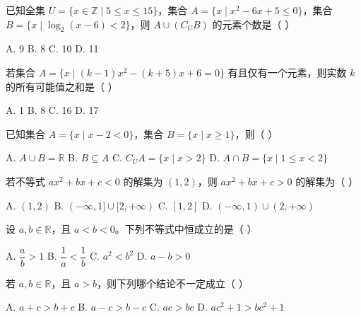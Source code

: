 \documentclass[11pt, a4paper]{article}
\begin{document}

\begin{baitap}[1]
已知全集 $U = \{x \in \mathbb{Z} \mid 5 \le x \le 15\}$，集合 $A = \{x \mid x^2 - 6x + 5 \le 0\}$，集合 $B = \{x \mid \log_2(x - 6) < 2\}$，则 $A \cup (C_U B)$ 的元素个数是（ ）
\par\vspace{3pt}
\noindent A. 9 \quad B. 8 \quad C. 10 \quad D. 11
\end{baitap}

\begin{baitap}[2]
若集合 $A = \{x \mid (k - 1)x^2 - (k + 5)x + 6 = 0\}$ 有且仅有一个元素，则实数 $k$ 的所有可能值之和是（ ）
\par\vspace{3pt}
\noindent A. 1 \quad B. 8 \quad C. 16 \quad D. 17
\end{baitap}

\begin{baitap}[3]
已知集合 $A = \{x \mid x - 2 < 0\}$，集合 $B = \{x \mid x \ge 1\}$，则（ ）
\par\vspace{3pt}
\noindent A. $A \cup B = \mathbb{R}$ \quad B. $B \subseteq A$ \quad C. $C_U A = \{x \mid x > 2\}$ \quad D. $A \cap B = \{x \mid 1 \le x < 2\}$
\end{baitap}

\begin{baitap}[4]
若不等式 $ax^2 + bx + c < 0$ 的解集为 $(1, 2)$，则 $ax^2 + bx + c > 0$ 的解集为（ ）
\par\vspace{3pt}
\noindent A. $(1, 2)$ \quad B. $(-\infty, 1] \cup [2, +\infty)$ \quad C. $[1, 2]$ \quad D. $(-\infty, 1) \cup (2, +\infty)$
\end{baitap}

\begin{baitap}[5]
设 $a, b \in \mathbb{R}$，且 $a < b < 0$。下列不等式中恒成立的是（ ）
\par\vspace{3pt}
\noindent A. $\dfrac{a}{b} > 1$ \quad B. $\dfrac{1}{a} < \dfrac{1}{b}$ \quad C. $a^2 < b^2$ \quad D. $a - b > 0$
\end{baitap}

\begin{baitap}[6]
若 $a, b \in \mathbb{R}$，且 $a > b$，则下列哪个结论不一定成立（ ）
\par\vspace{3pt}
\noindent A. $a + c > b + c$ \quad B. $a - c > b - c$ \quad C. $ac > bc$ \quad D. $ac^2 + 1 > bc^2 + 1$
\end{baitap}
\end{document}
